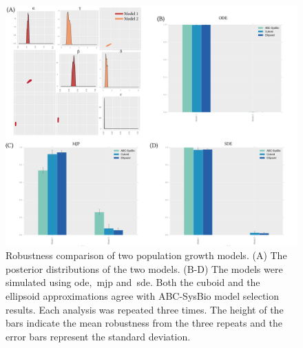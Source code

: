 \begin{figure}[p]
\begin{center}
\includegraphics[width=\textwidth]{../../chapters/chapterStabilityFinder/images/Example4_summ.png}
\caption[Robustness analysis of case study 2]{\label{fig:rob_sysbio4} Robustness comparison of two population growth models. (A) The posterior distributions of the two models. (B-D) The models were simulated using \acrshort{ode},~\acrshort{mjp} and~\acrshort{sde}. Both the cuboid and the ellipsoid approximations agree with ABC-SysBio model selection results. Each analysis was repeated three times. The height of the bars indicate the mean robustness from the three repeats and the error bars represent the standard deviation. }
\end{center}
\end{figure}

\clearpage



